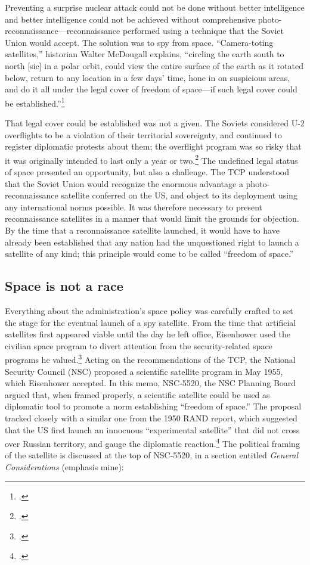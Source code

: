 \documentclass[14pt]{extarticle}
\begin{document}
Preventing a surprise nuclear attack could not be done without better intelligence and better intelligence could not be achieved without comprehensive photo-reconnaissance---reconnaissance performed using a technique that the Soviet Union would accept. The solution was to spy from space. \enquote{Camera-toting satellites,} historian Walter McDougall explains, \enquote{circling the earth south to north [sic] in a polar orbit, could view the entire surface of the earth as it rotated below, return to any location in a few days' time, hone in on suspicious areas, and do it all under the legal cover of freedom of space---if such legal cover could be established.}\footcite[p.~117]{mcdougall_heavens_1985}

That legal cover could be established was not a given. The Soviets considered U-2 overflights to be a violation of their territorial sovereignty, and continued to register diplomatic protests about them; the overflight program was so risky that it was originally intended to last only a year or two.\footcite[p.~33]{lindgren_trust_2000} The undefined legal status of space presented an opportunity, but also a challenge. The TCP understood that the Soviet Union would recognize the enormous advantage a photo-reconnaissance satellite conferred on the US, and object to its deployment using any international norms possible. It was therefore necessary to present reconnaissance satellites in a manner that would limit the grounds for objection. By the time that a reconnaissance satellite launched, it would have to have already been established that any nation had the unquestioned right to launch a satellite of any kind; this principle would come to be called \enquote{freedom of space.}

\subsection{Space is not a race}
Everything about the administration's space policy was carefully crafted to set the stage for the eventual launch of a spy satellite. From the time that artificial satellites first appeared viable until the day he left office, Eisenhower used the civilian space program to divert attention from the security-related space programs he valued.\footcite[p.~119]{day_eye_2015} Acting on the recommendations of the TCP, the National Security Council (NSC) proposed a scientific satellite program in May 1955, which Eisenhower accepted. In this memo, NSC-5520, the NSC Planning Board argued that, when framed properly, a scientific satellite could be used as diplomatic tool to promote a norm establishing ``freedom of space.'' The proposal tracked closely with a similar one from the 1950 RAND report, which suggested that the US first launch an innocuous ``experimental satellite'' that did not cross over Russian territory, and gauge the diplomatic reaction.\footcite[p.~21]{kecskemetic_satellite_1950} The political framing of the satellite is discussed at the top of NSC-5520, in a section entitled \emph{General Considerations} (emphasis mine):
\newline
\end{document}
